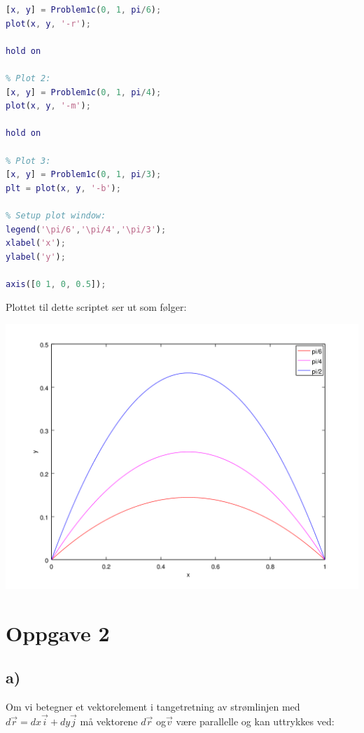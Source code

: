 \documentclass{article}
\begin{document}
\begin{lstlisting}[language=Matlab]
% Plot 1:
[x, y] = Problem1c(0, 1, pi/6);
plot(x, y, '-r');

hold on

% Plot 2:
[x, y] = Problem1c(0, 1, pi/4);
plot(x, y, '-m');

hold on

% Plot 3:
[x, y] = Problem1c(0, 1, pi/3);
plt = plot(x, y, '-b');

% Setup plot window:
legend('\pi/6','\pi/4','\pi/3');
xlabel('x');
ylabel('y');

axis([0 1, 0, 0.5]);
\end{lstlisting}

\bigskip

Plottet til dette scriptet ser ut som følger:

\includegraphics[scale=0.6]{images/Problem1c}

\newpage


%
%

\section*{Oppgave 2}

%
%

\subsection*{a)}

\begin{flushleft}
Om vi betegner et vektorelement i tangetretning av strømlinjen med \(d\vec{r} = dx\vec{i} + dy\vec{j}\) må vektorene \(d\vec{r}\) og\(\vec{v}\) være parallelle og kan uttrykkes ved:
\end{flushleft}
\end{document}
